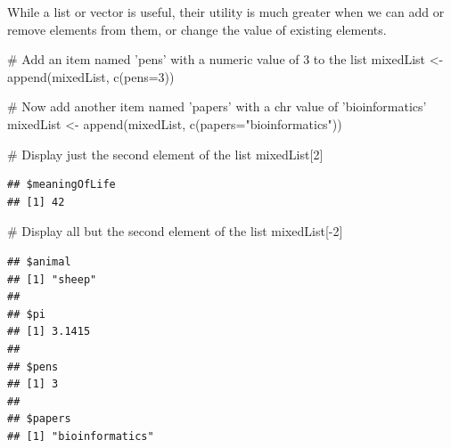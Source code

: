 \documentclass[a4paper]{book}
\newenvironment{Shaded}{}{}
\newcommand{\KeywordTok}[1]{\textcolor[rgb]{0.00,0.00,1.00}{{#1}}}
\newcommand{\DataTypeTok}[1]{{#1}}
\newcommand{\DecValTok}[1]{{#1}}
\newcommand{\StringTok}[1]{\textcolor[rgb]{0.00,0.50,0.50}{{#1}}}
\newcommand{\CommentTok}[1]{\textcolor[rgb]{0.00,0.50,0.00}{{#1}}}
\newcommand{\OtherTok}[1]{\textcolor[rgb]{1.00,0.25,0.00}{{#1}}}
\newcommand{\NormalTok}[1]{{#1}}
\newlength{\leftbarwidth}
\newlength{\leftbarsep}
\newcommand*{\leftbarcolorcmd}{\color{darkgray}}%
\renewenvironment{leftbar}{%
    \def\FrameCommand{{\leftbarcolorcmd{\vrule width \leftbarwidth\relax\hspace {\leftbarsep}}}}%
    \MakeFramed {\advance \hsize -\width \FrameRestore }%
}{%
    \endMakeFramed
}
\renewenvironment{Shaded}
{\vspace{0em}\begin{leftbar}\begin{snugshade}}
{\end{snugshade}\end{leftbar}\vspace{0pt}}
\begin{document}
While a list or vector is useful, their utility is much greater when we
can add or remove elements from them, or change the value of existing
elements.

\begin{Shaded}
\begin{Highlighting}[]
\CommentTok{# Add an item named 'pens' with a numeric value of 3 to the list}
\NormalTok{mixedList <-}\StringTok{ }\KeywordTok{append}\NormalTok{(mixedList, }\KeywordTok{c}\NormalTok{(}\DataTypeTok{pens=}\DecValTok{3}\NormalTok{))}

\CommentTok{# Now add another item named 'papers' with a chr value of 'bioinformatics'}
\NormalTok{mixedList <-}\StringTok{ }\KeywordTok{append}\NormalTok{(mixedList, }\KeywordTok{c}\NormalTok{(}\DataTypeTok{papers=}\StringTok{"bioinformatics"}\NormalTok{))}

\CommentTok{# Display just the second element of the list}
\NormalTok{mixedList[}\DecValTok{2}\NormalTok{]}
\end{Highlighting}
\end{Shaded}

\begin{verbatim}
## $meaningOfLife
## [1] 42
\end{verbatim}

\begin{Shaded}
\begin{Highlighting}[]
\CommentTok{# Display all but the second element of the list}
\NormalTok{mixedList[-}\DecValTok{2}\NormalTok{]}
\end{Highlighting}
\end{Shaded}

\begin{verbatim}
## $animal
## [1] "sheep"
## 
## $pi
## [1] 3.1415
## 
## $pens
## [1] 3
## 
## $papers
## [1] "bioinformatics"
\end{verbatim}

\begin{Shaded}
\end{Shaded}
\end{document}
